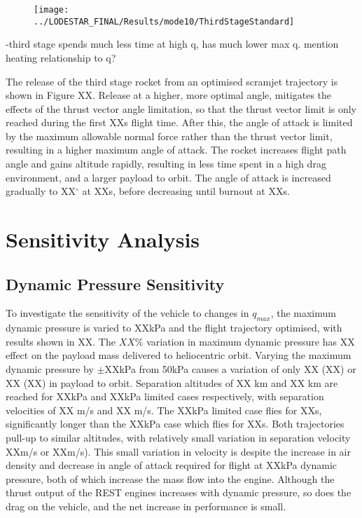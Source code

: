 \begin{figure}[ht]
\centering
\texttt{[image: ../LODESTAR\_FINAL/Results/mode10/ThirdStageStandard]}
\caption{}
\label{fig:ThirdStageStandardNoReturn}
\end{figure}

-third stage spends much less time at high q, has much lower max q. mention heating relationship to q?


The release of the third stage rocket from an optimised scramjet trajectory is shown in Figure XX. Release at a higher, more optimal angle, mitigates the effects of the thrust vector angle limitation, so that the thrust vector limit is only reached during the first XXs flight time. After this, the angle of attack is limited by the maximum allowable normal force rather than the thrust vector limit, resulting in a higher maximum angle of attack. The rocket increases flight path angle and gains altitude rapidly, resulting in less time spent in a high drag environment, and a larger payload to orbit.  The angle of attack is increased gradually to XX$^\circ$ at XXs, before decreasing until burnout at XXs.


\section{Sensitivity Analysis}


\subsection{Dynamic Pressure Sensitivity}\label{sec:qvariation}

To investigate the sensitivity of the vehicle to changes in $q_{max}$, the maximum dynamic pressure is varied to XXkPa and the flight trajectory optimised, with results shown in XX.
The $XX\%$ variation in maximum dynamic pressure has XX effect on the payload mass delivered to heliocentric orbit.  Varying the maximum dynamic pressure by $\pm$XXkPa from 50kPa causes a variation of only  XX (XX) or XX (XX) in payload to orbit.  
Separation altitudes of XX km and XX km are reached for XXkPa and XXkPa limited cases respectively, with separation velocities of XX m/s and XX m/s. The XXkPa limited case flies for XXs, significantly longer than the XXkPa case which flies for XXs.
Both trajectories pull-up to similar altitudes, with relatively small variation in separation velocity XXm/s or XXm/s).
This small variation in velocity is despite the increase in air density and decrease in angle of attack required for flight at XXkPa dynamic pressure, both of which increase the mass flow into the engine. Although the thrust output of the REST engines increases with dynamic pressure, so does the drag on the vehicle, and the net increase in performance is small. 



